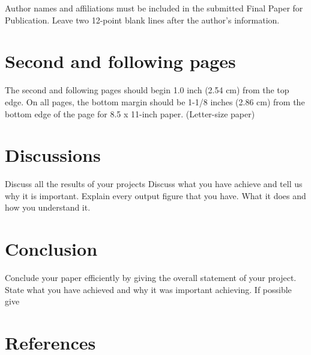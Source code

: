 \documentclass[10pt,sigconf, review]{article}
\begin{document}
Author names and affiliations must be included in the submitted Final Paper for
Publication. Leave two 12-point blank lines after the author’s information. 

\section{Second and following pages}
\label{sect:pdf}

The second and following pages should begin 1.0 inch (2.54 cm) from the top
edge. On all pages, the bottom margin should be 1-1/8 inches (2.86 cm) from the
bottom edge of the page for 8.5 x 11-inch paper. (Letter-size paper)




\section{Discussions}
Discuss all the results of your projects Discuss what you have achieve and tell
us why it is important. Explain every output figure that you have. What it does
and how you understand it.

\section{Conclusion}
Conclude your paper efficiently by giving the overall statement of your
project. State what you have achieved and why it was important achieving. If
possible give 


\section{References} 

\end{document}
